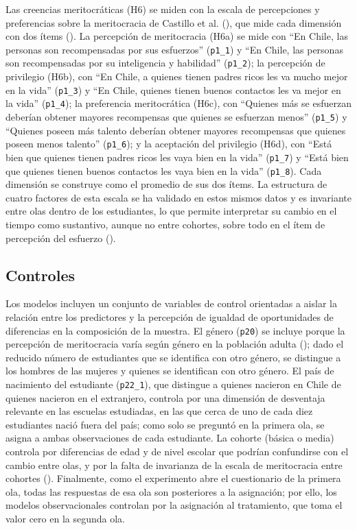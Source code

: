 \documentclass[
  spanish,
  a4paper,
  oneside]{scrbook}
\begin{document}
Las creencias meritocráticas (H6) se miden con la escala de percepciones
y preferencias sobre la meritocracia de Castillo et al.
(), que mide cada
dimensión con dos ítems (). La percepción de meritocracia (H6a) se mide con ``En Chile, las
personas son recompensadas por sus esfuerzos'' (\texttt{p1\_1}) y ``En
Chile, las personas son recompensadas por su inteligencia y habilidad''
(\texttt{p1\_2}); la percepción de privilegio (H6b), con ``En Chile, a
quienes tienen padres ricos les va mucho mejor en la vida''
(\texttt{p1\_3}) y ``En Chile, quienes tienen buenos contactos les va
mejor en la vida'' (\texttt{p1\_4}); la preferencia meritocrática (H6c),
con ``Quienes más se esfuerzan deberían obtener mayores recompensas que
quienes se esfuerzan menos'' (\texttt{p1\_5}) y ``Quienes poseen más
talento deberían obtener mayores recompensas que quienes poseen menos
talento'' (\texttt{p1\_6}); y la aceptación del privilegio (H6d), con
``Está bien que quienes tienen padres ricos les vaya bien en la vida''
(\texttt{p1\_7}) y ``Está bien que quienes tienen buenos contactos les
vaya bien en la vida'' (\texttt{p1\_8}). Cada dimensión se construye
como el promedio de sus dos ítems. La estructura de cuatro factores de
esta escala se ha validado en estos mismos datos y es invariante entre
olas dentro de los estudiantes, lo que permite interpretar su cambio en
el tiempo como sustantivo, aunque no entre cohortes, sobre todo en el
ítem de percepción del esfuerzo ().

\subsection{Controles}\label{controles}

Los modelos incluyen un conjunto de variables de control orientadas a
aislar la relación entre los predictores y la percepción de igualdad de
oportunidades de diferencias en la composición de la muestra. El género
(\texttt{p20}) se incluye porque la percepción de meritocracia varía
según género en la población adulta
();
dado el reducido número de estudiantes que se identifica con otro
género, se distingue a los hombres de las mujeres y quienes se
identifican con otro género. El país de nacimiento del estudiante
(\texttt{p22\_1}), que distingue a quienes nacieron en Chile de quienes
nacieron en el extranjero, controla por una dimensión de desventaja
relevante en las escuelas estudiadas, en las que cerca de uno de cada
diez estudiantes nació fuera del país; como solo se preguntó en la
primera ola, se asigna a ambas observaciones de cada estudiante. La
cohorte (básica o media) controla por diferencias de edad y de nivel
escolar que podrían confundirse con el cambio entre olas, y por la falta
de invarianza de la escala de meritocracia entre cohortes
(). Finalmente, como
el experimento abre el cuestionario de la primera ola, todas las
respuestas de esa ola son posteriores a la asignación; por ello, los
modelos observacionales controlan por la asignación al tratamiento, que
toma el valor cero en la segunda ola.
\end{document}
